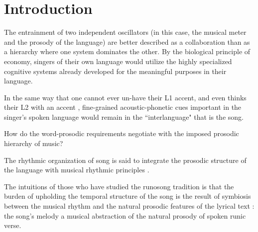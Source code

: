 \chapter{Introduction}




The entrainment of two independent oscillators (in this case, the musical meter and the prosody of the language) are better described as a collaboration than as a hierarchy where one system dominates the other. By the biological principle of economy, singers of their own language would utilize the highly specialized cognitive systems already developed for the meaningful purposes in their language.  





In the same way that one cannot ever un-have their L1 accent, and even thinks their L2 with an accent \citep{park2009}, fine-grained acoustic-phonetic cues important in the singer's spoken language would remain in the ``interlanguage" that is the song.

How do the word-prosodic requirements negotiate with the imposed prosodic hierarchy of music? 


The rhythmic organization of song is said to integrate the prosodic structure of the language with musical rhythmic principles \citep{palmer1992}. 



The intuitions of those who have studied the runosong tradition is that the burden of upholding the temporal structure of the song is the result of symbiosis between the musical rhythm and the natural prosodic features of the lyrical text \citep{ross1992, tampere1934}: the song's melody a musical abstraction of the natural prosody of spoken runic verse.
 



